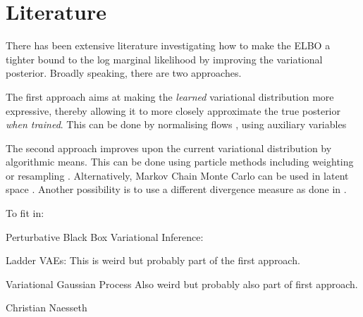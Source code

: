 \section{Literature}
There has been extensive literature investigating how to make the ELBO a tighter bound to the log marginal likelihood by improving the variational posterior.
Broadly speaking, there are two approaches.

The first approach aims at making the \emph{learned} variational distribution more expressive, thereby allowing it to more closely approximate the true posterior \emph{when trained}.
This can be done by normalising flows \citep{RezendeVariational2015,Kingma2016improving},
using auxiliary variables \citep{MaaloeAuxiliary2016} \citep{Ranganath2016hierarchical}

The second approach improves upon the current variational distribution by algorithmic means. This can be done using particle methods including weighting \citep{Burda2015importance} or resampling \citep{Maddison2017filtering}\citep{Le2017auto}. Alternatively, Markov Chain Monte Carlo can be used in latent space \citep{SalimansMarkov2015}.
Another possibility is to use a different divergence measure as done in \citep{Li2016renyi}.


To fit in:

Perturbative Black Box Variational Inference:
\citep{BamlerPerturbative2017}

Ladder VAEs:
\citep{SoNderbyLadder2016}
This is weird but probably part of the first approach.

Variational Gaussian Process
\citep{TranVariational2015}
Also weird but probably also part of first approach.

Christian Naesseth
\citep{Naesseth2017variational}
